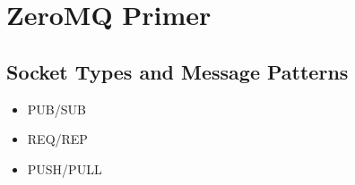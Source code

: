 \chapter{ZeroMQ Primer}
\label{zeromq_primer}

\section{Socket Types and Message Patterns}

\begin{itemize}

\item PUB/SUB

\item REQ/REP

\item PUSH/PULL

\end{itemize}
